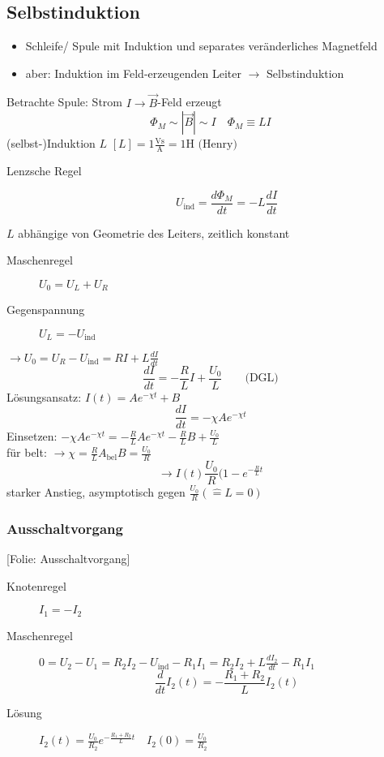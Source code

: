 \documentclass[titlepage,12pt,a4paper,ngerman]{report}
\newcommand{\tx}[1]{\textrm{#1}}
\newcommand{\uind}{U_{\tx{ind}}}
\newcommand{\folie}[1]{\color{gray}[Folie: #1]\color{black}}
\begin{document}

\subsection{Selbstinduktion}
\begin{itemize}
	\item Schleife/ Spule mit Induktion und separates veränderliches Magnetfeld
	\item aber: Induktion im Feld-erzeugenden Leiter $\rightarrow$ Selbstinduktion
\end{itemize}
Betrachte Spule: Strom $I \rightarrow \vec{B}$-Feld erzeugt
$$\Phi_M \sim |\vec{B}| \sim I \quad \boxed{\Phi_M \equiv LI}$$
(selbst-)Induktion $L$ $[L] = 1\frac{\tx{Vs}}{\tx{A}} = 1 \tx{H (Henry)}$
\begin{description}
	\item [Lenzsche Regel] $$\boxed{U_{\tx{ind}} = \frac{d \Phi_M}{dt} = - L \frac{dI}{dt}}$$
\end{description}
$L$ abhängige von Geometrie des Leiters, zeitlich konstant
\begin{description}
	\item [Maschenregel] $U_0 = U_L + U_R$
	\item [Gegenspannung] $U_L = - \uind $
\end{description}
$\rightarrow U_0 = U_R - \uind = RI + L \frac{dI}{dt}$
$$\frac{dI}{dt}= - \frac{R}{L} I + \frac{U_0}{L} \qquad \tx{(DGL)}$$
Lösungsansatz: $I(t) = Ae^{-\chi t} + B$
$$\frac{dI}{dt} = -\chi Ae^{-\chi t}$$
Einsetzen: $- \chi A e^{-\chi t} = - \frac{R}{L} A e^{-\chi t} - \frac{R}{L}B + \frac{U_0}{L}$\\
für belt: $\rightarrow \chi = \frac{R}{L} A_{\tx{bel}} B = \frac{U_0}{R}$
$$\rightarrow I(t) \frac{U_0}{R} (1-e^{-\frac{R}{L} t}$$
starker Anstieg, asymptotisch gegen $\frac{U_0}{R} (\hat{=} L = 0)$

\subsubsection{Ausschaltvorgang}
\folie{Ausschaltvorgang}
\begin{description}
	\item [Knotenregel] $I_1 = -I_2$
	\item [Maschenregel] $0 = U_2 - U_1 = R_2 I_2 - \uind - R_1 I_1 = R_2 I_2 + L \frac{dI_2}{dt} - R_1 I_1$
	$$\frac{d}{dt} I_2 (t) = - \frac{R_1 + R_2}{L} I_2 (t)$$
	\item [Lösung] $I_2 (t) = \frac{U_0}{R_2} e^{-\frac{R_1 +R_2}{L} t} \quad I_2(0) = \frac{U_0}{R_2}$
\end{description}
\end{document}
